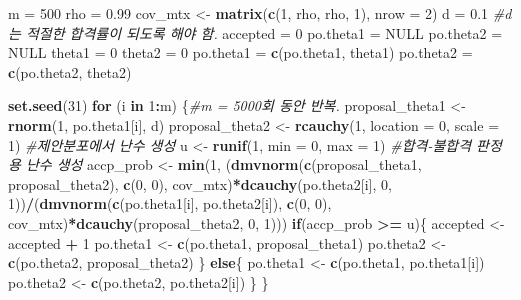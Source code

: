 \documentclass[
]{article}
\newenvironment{Shaded}{\begin{snugshade}}{\end{snugshade}}
\newcommand{\AttributeTok}[1]{\textcolor[rgb]{0.13,0.29,0.53}{#1}}
\newcommand{\CommentTok}[1]{\textcolor[rgb]{0.56,0.35,0.01}{\textit{#1}}}
\newcommand{\ConstantTok}[1]{\textcolor[rgb]{0.56,0.35,0.01}{#1}}
\newcommand{\ControlFlowTok}[1]{\textcolor[rgb]{0.13,0.29,0.53}{\textbf{#1}}}
\newcommand{\DecValTok}[1]{\textcolor[rgb]{0.00,0.00,0.81}{#1}}
\newcommand{\FloatTok}[1]{\textcolor[rgb]{0.00,0.00,0.81}{#1}}
\newcommand{\FunctionTok}[1]{\textcolor[rgb]{0.13,0.29,0.53}{\textbf{#1}}}
\newcommand{\NormalTok}[1]{#1}
\newcommand{\OtherTok}[1]{\textcolor[rgb]{0.56,0.35,0.01}{#1}}
\newcommand{\SpecialCharTok}[1]{\textcolor[rgb]{0.81,0.36,0.00}{\textbf{#1}}}
\begin{document}
\begin{Shaded}
\begin{Highlighting}[]
\NormalTok{m }\OtherTok{=} \DecValTok{500}
\NormalTok{rho }\OtherTok{=} \FloatTok{0.99}
\NormalTok{cov\_mtx }\OtherTok{\textless{}{-}} \FunctionTok{matrix}\NormalTok{(}\FunctionTok{c}\NormalTok{(}\DecValTok{1}\NormalTok{, rho, rho, }\DecValTok{1}\NormalTok{), }\AttributeTok{nrow =} \DecValTok{2}\NormalTok{)}
\NormalTok{d }\OtherTok{=} \FloatTok{0.1} \CommentTok{\#d는 적절한 합격률이 되도록 해야 함. }
\NormalTok{accepted }\OtherTok{=} \DecValTok{0}
\NormalTok{po.theta1 }\OtherTok{=} \ConstantTok{NULL}
\NormalTok{po.theta2 }\OtherTok{=} \ConstantTok{NULL}
\NormalTok{theta1 }\OtherTok{=} \DecValTok{0}
\NormalTok{theta2 }\OtherTok{=} \DecValTok{0}
\NormalTok{po.theta1 }\OtherTok{=} \FunctionTok{c}\NormalTok{(po.theta1, theta1)}
\NormalTok{po.theta2 }\OtherTok{=} \FunctionTok{c}\NormalTok{(po.theta2, theta2) }

\FunctionTok{set.seed}\NormalTok{(}\DecValTok{31}\NormalTok{)}
\ControlFlowTok{for}\NormalTok{ (i }\ControlFlowTok{in} \DecValTok{1}\SpecialCharTok{:}\NormalTok{m) \{}\CommentTok{\#m = 5000회 동안 반복.}
\NormalTok{  proposal\_theta1 }\OtherTok{\textless{}{-}} \FunctionTok{rnorm}\NormalTok{(}\DecValTok{1}\NormalTok{, po.theta1[i], d)}
\NormalTok{  proposal\_theta2 }\OtherTok{\textless{}{-}} \FunctionTok{rcauchy}\NormalTok{(}\DecValTok{1}\NormalTok{, }\AttributeTok{location =} \DecValTok{0}\NormalTok{, }\AttributeTok{scale =} \DecValTok{1}\NormalTok{) }\CommentTok{\#제안분포에서 난수 생성}
\NormalTok{  u }\OtherTok{\textless{}{-}} \FunctionTok{runif}\NormalTok{(}\DecValTok{1}\NormalTok{, }\AttributeTok{min =} \DecValTok{0}\NormalTok{, }\AttributeTok{max =} \DecValTok{1}\NormalTok{) }\CommentTok{\#합격{-}불합격 판정용 난수 생성}
\NormalTok{  accp\_prob }\OtherTok{\textless{}{-}} \FunctionTok{min}\NormalTok{(}\DecValTok{1}\NormalTok{, (}\FunctionTok{dmvnorm}\NormalTok{(}\FunctionTok{c}\NormalTok{(proposal\_theta1, proposal\_theta2), }\FunctionTok{c}\NormalTok{(}\DecValTok{0}\NormalTok{, }\DecValTok{0}\NormalTok{), cov\_mtx)}\SpecialCharTok{*}\FunctionTok{dcauchy}\NormalTok{(po.theta2[i], }\DecValTok{0}\NormalTok{, }\DecValTok{1}\NormalTok{))}\SpecialCharTok{/}\NormalTok{(}\FunctionTok{dmvnorm}\NormalTok{(}\FunctionTok{c}\NormalTok{(po.theta1[i], po.theta2[i]), }\FunctionTok{c}\NormalTok{(}\DecValTok{0}\NormalTok{, }\DecValTok{0}\NormalTok{), cov\_mtx)}\SpecialCharTok{*}\FunctionTok{dcauchy}\NormalTok{(proposal\_theta2, }\DecValTok{0}\NormalTok{, }\DecValTok{1}\NormalTok{)))}
  \ControlFlowTok{if}\NormalTok{(accp\_prob }\SpecialCharTok{\textgreater{}=}\NormalTok{ u)\{}
\NormalTok{    accepted }\OtherTok{\textless{}{-}}\NormalTok{ accepted }\SpecialCharTok{+} \DecValTok{1}
\NormalTok{    po.theta1 }\OtherTok{\textless{}{-}} \FunctionTok{c}\NormalTok{(po.theta1, proposal\_theta1)}
\NormalTok{    po.theta2 }\OtherTok{\textless{}{-}} \FunctionTok{c}\NormalTok{(po.theta2, proposal\_theta2)}
\NormalTok{  \} }\ControlFlowTok{else}\NormalTok{\{}
\NormalTok{    po.theta1 }\OtherTok{\textless{}{-}} \FunctionTok{c}\NormalTok{(po.theta1, po.theta1[i])}
\NormalTok{    po.theta2 }\OtherTok{\textless{}{-}} \FunctionTok{c}\NormalTok{(po.theta2, po.theta2[i])}
\NormalTok{  \}}
\NormalTok{\}}


\end{Highlighting}
\end{Shaded}
\end{document}
